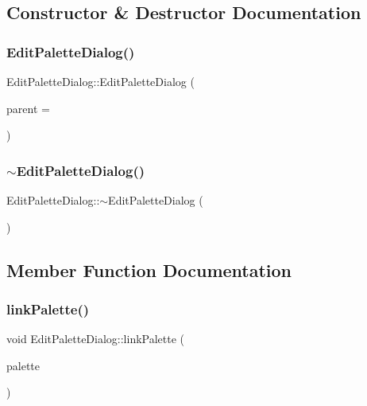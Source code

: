 \subsection{Constructor \& Destructor Documentation}
\mbox{\label{class_edit_palette_dialog_a8954169846ffb0629c7e7660a1c6e2b3}} 
\subsubsection{\texorpdfstring{EditPaletteDialog()}{EditPaletteDialog()}}
{\footnotesize\ttfamily Edit\+Palette\+Dialog\+::\+Edit\+Palette\+Dialog (\begin{DoxyParamCaption}\item[{Q\+Widget $\ast$}]{parent = {} }\end{DoxyParamCaption})\hspace{0.3cm}{\ttfamily [explicit]}}

\mbox{\label{class_edit_palette_dialog_a00f4efe132d80838589a9e8105bc918f}} 
\subsubsection{\texorpdfstring{$\sim$EditPaletteDialog()}{~EditPaletteDialog()}}
{\footnotesize\ttfamily Edit\+Palette\+Dialog\+::$\sim$\+Edit\+Palette\+Dialog (\begin{DoxyParamCaption}{ }\end{DoxyParamCaption})}



\subsection{Member Function Documentation}
\mbox{\label{class_edit_palette_dialog_ae745b99777f862e73394d4ae49e9b5f4}} 
\subsubsection{\texorpdfstring{linkPalette()}{linkPalette()}}
{\footnotesize\ttfamily void Edit\+Palette\+Dialog\+::link\+Palette (\begin{DoxyParamCaption}\item[{\mbox{\hyperlink{class_palette}{Palette}} $\ast$}]{palette }\end{DoxyParamCaption})}

